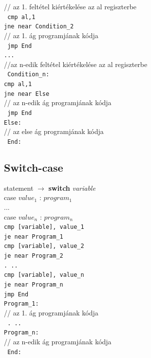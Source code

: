 \documentclass[12pt,margin=0px]{article}
\begin{document}
    \noindent // az 1. feltétel kiértékelése az al regiszterbe\\
    \texttt{
    cmp al,1\\
    jne near Condition\_2\\
    }
    // az 1. ág programjának kódja\\
    \texttt{
    jmp End\\
    ...\\
    }
    //az n-edik feltétel kiértékelése az al regiszterbe\\
    \texttt{
    Condition\_n: \\
    cmp al,1\\
    jne near Else\\
    }
    // az n-edik ág programjának kódja\\
    \texttt{
    jmp End\\
    Else:\\
    }
    // az else ág programjának kódja\\
    \texttt{
    End:
    }

    \subsection*{Switch-case}

	statement $ \rightarrow $ \textbf{switch} \emph{variable}
	\\case $ value_1 $ : $ program_1 $
	\\...
	\\case $ value_n $ : $ program_n $\\

    \noindent \texttt{cmp [variable], value\_1\\
    je near Program\_1\\
    cmp [variable], value\_2\\
    je near Program\_2\\
    . ..\\
    cmp [variable], value\_n\\
    je near Program\_n\\
    jmp End\\
    Program\_1:\\
    }
    // az 1. ág programjának kódja\\
    \texttt{
    . ..\\
    Program\_n:\\
    }
    // az n-edik ág programjának kódja\\
    \texttt{
    End:
    }
\end{document}

